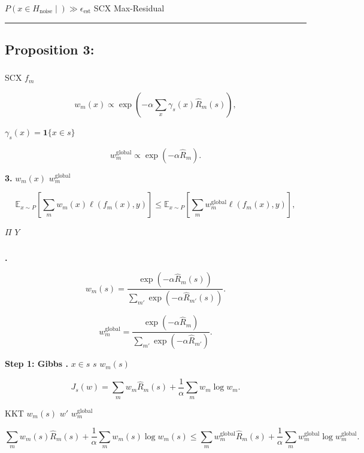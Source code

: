 \documentclass[
  12pt,
]{article}
\begin{document}
\(P(x \in H_{\text{noise}} \mid \text{}) \gg \epsilon_{\text{est}}\)
SCX  Max-Residual

\begin{center}\rule{0.5\linewidth}{0.5pt}\end{center}

\subsection{Proposition 3:
}\label{proposition-3-ux72b6ux6001ux6761ux4ef6ux6743ux91cdux4f18ux4e8eux5168ux5c40ux6743ux91cd}

\subsubsection{}\label{ux6570ux5b66ux9648ux8ff0-2}

 SCX  \(f_m\) 

\[w_m(x) \propto \exp\left(-\alpha \sum_x \gamma_s(x) \hat{R}_m(s)\right),\]

 \(\gamma_s(x) = \mathbf{1}\{x \in s\}\) 



\[w_m^{\text{global}} \propto \exp(-\alpha \hat{R}_m).\]

\textbf{ 3.}  \(w_m(x)\) 
\(w_m^{\text{global}}\)

\[\mathbb{E}_{x \sim P}\left[\sum_m w_m(x) \ell(f_m(x), y)\right] \leq \mathbb{E}_{x \sim P}\left[\sum_m w_m^{\text{global}} \ell(f_m(x), y)\right],\]

 \(\Pi\)  \(Y\) 

\subsubsection{}\label{ux8bc1ux660e-2}

\textbf{.} 

\[w_m(s) = \frac{\exp(-\alpha \hat{R}_m(s))}{\sum_{m'} \exp(-\alpha \hat{R}_{m'}(s))}.\]



\[w_m^{\text{global}} = \frac{\exp(-\alpha \hat{R}_m)}{\sum_{m'} \exp(-\alpha \hat{R}_{m'})}.\]

\textbf{Step 1:  Gibbs .}  \(x \in s\) \(s\)
 \(w_m(s)\) 

\[J_s(w) = \sum_m w_m \hat{R}_m(s) + \frac{1}{\alpha} \sum_m w_m \log w_m.\]

 KKT  \(w_m(s)\)
 \(w'\)
\(w_m^{\text{global}}\)

\[\sum_m w_m(s) \hat{R}_m(s) + \frac{1}{\alpha} \sum_m w_m(s) \log w_m(s) \leq \sum_m w_m^{\text{global}} \hat{R}_m(s) + \frac{1}{\alpha} \sum_m w_m^{\text{global}} \log w_m^{\text{global}}.\]
\end{document}
